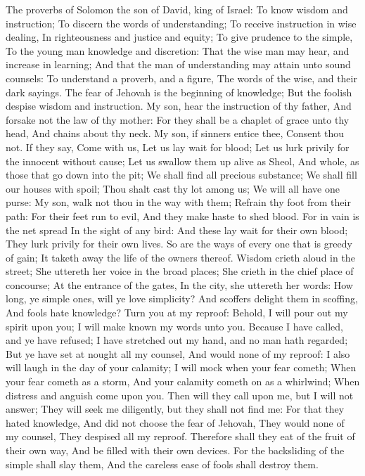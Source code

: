 


The proverbs of Solomon the son of David, king of Israel:  To know wisdom and instruction; To discern the words of understanding;  To receive instruction in wise dealing, In righteousness and justice and equity;  To give prudence to the simple, To the young man knowledge and discretion:  That the wise man may hear, and increase in learning; And that the man of understanding may attain unto sound counsels:  To understand a proverb, and a figure, The words of the wise, and their dark sayings.  The fear of Jehovah is the beginning of knowledge; But the foolish despise wisdom and instruction.  My son, hear the instruction of thy father, And forsake not the law of thy mother:  For they shall be a chaplet of grace unto thy head, And chains about thy neck.  My son, if sinners entice thee, Consent thou not.  If they say, Come with us, Let us lay wait for blood; Let us lurk privily for the innocent without cause;  Let us swallow them up alive as Sheol, And whole, as those that go down into the pit;  We shall find all precious substance; We shall fill our houses with spoil;  Thou shalt cast thy lot among us; We will all have one purse:  My son, walk not thou in the way with them; Refrain thy foot from their path:  For their feet run to evil, And they make haste to shed blood.  For in vain is the net spread In the sight of any bird:  And these lay wait for their own blood; They lurk privily for their own lives.  So are the ways of every one that is greedy of gain; It taketh away the life of the owners thereof.  Wisdom crieth aloud in the street; She uttereth her voice in the broad places;  She crieth in the chief place of concourse; At the entrance of the gates, In the city, she uttereth her words:  How long, ye simple ones, will ye love simplicity? And scoffers delight them in scoffing, And fools hate knowledge?  Turn you at my reproof: Behold, I will pour out my spirit upon you; I will make known my words unto you.  Because I have called, and ye have refused; I have stretched out my hand, and no man hath regarded;  But ye have set at nought all my counsel, And would none of my reproof:  I also will laugh in the day of your calamity; I will mock when your fear cometh;  When your fear cometh as a storm, And your calamity cometh on as a whirlwind; When distress and anguish come upon you.  Then will they call upon me, but I will not answer; They will seek me diligently, but they shall not find me:  For that they hated knowledge, And did not choose the fear of Jehovah,  They would none of my counsel, They despised all my reproof.  Therefore shall they eat of the fruit of their own way, And be filled with their own devices.  For the backsliding of the simple shall slay them, And the careless ease of fools shall destroy them.  